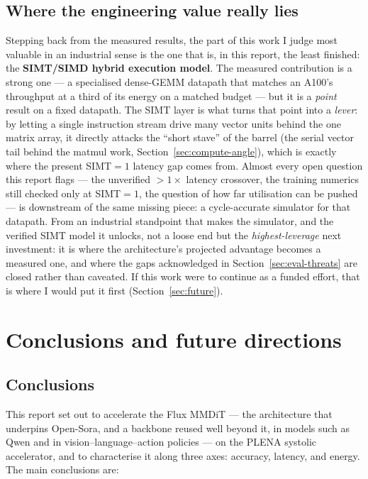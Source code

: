 \documentclass[11pt]{report}
\begin{document}
\section{Where the engineering value really lies}

Stepping back from the measured results, the part of this work I judge most
valuable in an industrial sense is the one that is, in this report, the least
finished: the \textbf{SIMT/SIMD hybrid execution model}. The measured
contribution is a strong one --- a specialised dense-GEMM datapath that
matches an A100's throughput at a third of its energy on a matched budget ---
but it is a \emph{point} result on a fixed datapath. The SIMT layer is what
turns that point into a \emph{lever}: by letting a single instruction stream
drive many vector units behind the one matrix array, it directly attacks the
``short stave'' of the barrel (the serial vector tail behind the matmul work,
Section~\ref{sec:compute-angle}), which is exactly where the present
SIMT$=1$ latency gap comes from. Almost every open question this report
flags --- the unverified $>$$1\times$ latency crossover, the training
numerics still checked only at SIMT$=1$, the question of how far utilisation
can be pushed --- is downstream of the same missing piece: a cycle-accurate
simulator for that datapath. From an industrial standpoint that makes the
simulator, and the verified SIMT model it unlocks, not a loose end but the
\emph{highest-leverage} next investment: it is where the architecture's
projected advantage becomes a measured one, and where the gaps acknowledged
in Section~\ref{sec:eval-threats} are closed rather than caveated. If this
work were to continue as a funded effort, that is where I would put it first
(Section~\ref{sec:future}).


\chapter{Conclusions and future directions}
\label{ch:conclusions}

\section{Conclusions}

This report set out to accelerate the Flux MMDiT --- the architecture that
underpins Open-Sora, and a backbone reused well beyond it, in models such as
Qwen and in vision--language--action policies --- on the PLENA systolic
accelerator, and to characterise it along three axes: accuracy, latency, and
energy. The main conclusions are:
\end{document}
